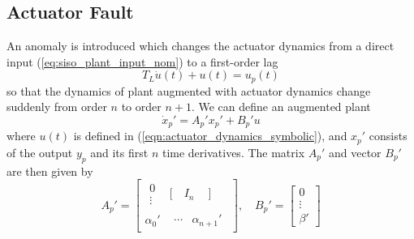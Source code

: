 \subsection{Actuator Fault} \label{subsec:siso_act_fault}
An anomaly is introduced which changes the actuator dynamics from a direct input (\ref{eq:siso_plant_input_nom}) to a first-order lag
\begin{equation}
	T_L\dot{u}(t) + u(t) = u_p(t) \label{eqn:actuator_dynamics_symbolic}
\end{equation} 
\noindent so that the dynamics of plant augmented with actuator dynamics change suddenly from order $n$ to order $n+1$. We can define an augmented plant 
\begin{equation}
	\dot{x}_p' = A_p' x_p' + B_p' u	
\end{equation}
where $u(t)$ is defined in (\ref{eqn:actuator_dynamics_symbolic}), and $x_p'$ consists of the output $y_p$ and its first $n$ time derivatives. The matrix $A_p'$ and vector $B_p'$ are then given by
\begin{equation}
	A_p' = \begin{bmatrix}
		\begin{matrix}0 \\ \vdots \end{matrix} & \Bigg[ \quad I_n \quad ~ \Bigg] \\ \alpha_0' & \begin{matrix}\cdots & \alpha_{n+1}' \end{matrix}
	\end{bmatrix}, \quad B_p' = \begin{bmatrix}
		0 \\ \vdots \\ \beta'
	\end{bmatrix}
	\label{eqn:plant_3_symbolic}
\end{equation}
